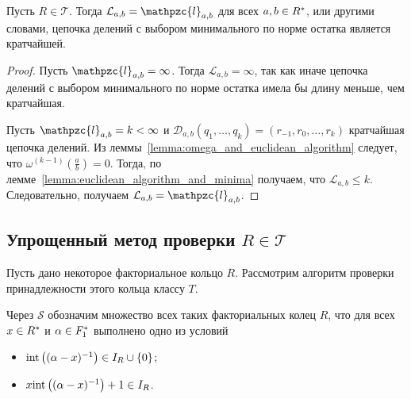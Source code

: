\documentclass[_00_dissertation.tex]{subfiles}
\begin{document}
\begin{theorem}\label{theorem:Kroneker_Vahlen_theorem_in_UFD}
    Пусть $R \in \mathcal{T}$.
    Тогда $\mathcal{L}_{a, b} = \mathpzc{l}_{a, b}$ для всех $a, b \in R^{*}$, или другими словами, цепочка делений с выбором минимального по норме остатка является кратчайшей.
\end{theorem}
\begin{proof}
    Пусть $\mathpzc{l}_{a, b} = \infty$.
    Тогда $\mathcal{L}_{a, b} = \infty$, так как иначе цепочка делений с выбором минимального по норме остатка имела бы длину меньше, чем кратчайшая.

    Пусть $\mathpzc{l}_{a, b} = k < \infty$ и $\mathcal{D}_{a, b}(q_1, \dots, q_k) = (r_{-1}, r_0, \dots, r_k)$ кратчайшая цепочка делений.
    Из леммы~\ref{lemma:omega_and_euclidean_algorithm} следует, что $\omega^{(k-1)}\left(\frac{a}{b}\right) = 0$.
    Тогда, по лемме~\ref{lemma:euclidean_algorithm_and_minima} получаем, что $\mathcal{L}_{a, b} \le k$.
    Следовательно, получаем $\mathcal{L}_{a, b} = \mathpzc{l}_{a, b}$.
\end{proof}

\subsection{Упрощенный метод проверки $R \in \mathcal{T}$}

Пусть дано некоторое факториальное кольцо $R$.
Рассмотрим алгоритм проверки принадлежности этого кольца классу $T$.

\begin{definition}
    Через $\mathcal{S}$ обозначим множество всех таких факториальных колец $R$, что для всех $x \in R^{*}$ и $\alpha \in F_1^{*}$ выполнено одно из условий
    \begin{itemize}
        \item $\textrm{int}\left((\alpha - x)^{-1}\right) \in I_{R} \cup \{0\}$;
        
        \item $x \textrm{int}\left((\alpha - x)^{-1}\right) + 1 \in I_{R}$.
    \end{itemize}
\end{definition}
\end{document}
